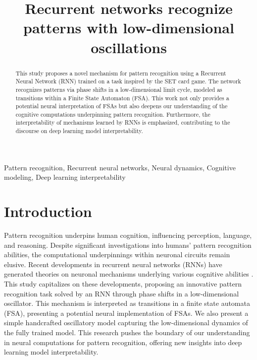 \documentclass[conference]{IEEEtran}
\begin{document}
\title{Recurrent networks recognize patterns with low-dimensional oscillations}

\author{
}

\maketitle

\begin{abstract}
This study proposes a novel mechanism for pattern recognition using a Recurrent Neural Network (RNN) trained on a task inspired by the SET card game. The network recognizes patterns via phase shifts in a low-dimensional limit cycle, modeled as transitions within a Finite State Automaton (FSA). This work not only provides a potential neural interpretation of FSAs but also deepens our understanding of the cognitive computations underpinning pattern recognition. Furthermore, the interpretability of mechanisms learned by RNNs is emphasized, contributing to the discourse on deep learning model interpretability.
\end{abstract}

\begin{IEEEkeywords}
Pattern recognition, Recurrent neural networks, Neural dynamics, Cognitive modeling, Deep learning interpretability
\end{IEEEkeywords}

\section{Introduction}
Pattern recognition underpins human cognition, influencing perception, language, and reasoning. Despite significant investigations into humans' pattern recognition abilities\cite{Inhelder1964-INHTEG}, the computational underpinnings within neuronal circuits remain elusive. Recent developments in recurrent neural networks (RNNs) have generated theories on neuronal mechanisms underlying various cognitive abilities \cite{sussillo2013opening,mante2013context,driscoll2022flexible,kay2022neural}. This study capitalizes on these developments, proposing an innovative pattern recognition task solved by an RNN through phase shifts in a low-dimensional oscillator. This mechanism is interpreted as transitions in a finite state automata (FSA), presenting a potential neural implementation of FSAs. We also present a simple handcrafted oscillatory model capturing the low-dimensional dynamics of the fully trained model. This research pushes the boundary of our understanding in neural computations for pattern recognition, offering new insights into deep learning model interpretability.
\end{document}
